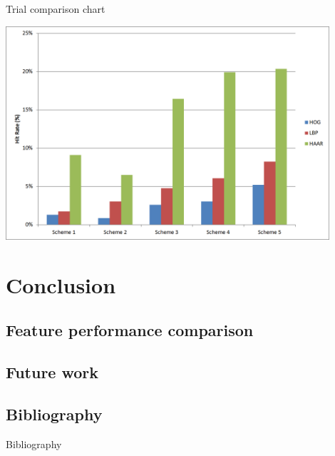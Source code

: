 \documentclass{beamer}
\begin{document}
\begin{frame}{Trial comparison chart}
	\begin{center}
		\includegraphics[width=0.9\textwidth]{results_graph}
	\end{center}
\end{frame}

\section{Conclusion}

	\subsection{Feature performance comparison}

	\subsection{Future work}

	\subsection{Bibliography}

	\begin{frame}{Bibliography}
		
		
	\end{frame}
\end{document}
